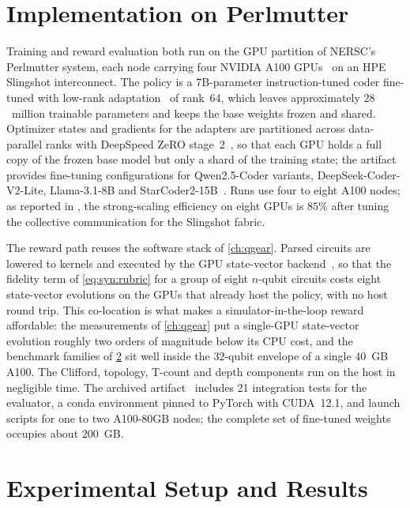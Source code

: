 \section{Implementation on Perlmutter}\label{sec:syn:impl}

Training and reward evaluation both run on the GPU partition of NERSC's Perlmutter system, each node carrying four NVIDIA A100 GPUs~\cite{choquette2021a100} on an HPE Slingshot interconnect. The policy is a 7B-parameter instruction-tuned coder fine-tuned with low-rank adaptation~\cite{hu2022lora} of rank~$64$, which leaves approximately $28$~million trainable parameters and keeps the base weights frozen and shared. Optimizer states and gradients for the adapters are partitioned across data-parallel ranks with DeepSpeed ZeRO stage~2~\cite{rajbhandari2020zero}, so that each GPU holds a full copy of the frozen base model but only a shard of the training state; the artifact provides fine-tuning configurations for Qwen2.5-Coder variants, DeepSeek-Coder-V2-Lite, Llama-3.1-8B and StarCoder2-15B~\cite{guo2026rubriqsoftware}. Runs use four to eight A100 nodes; as reported in \cite{guo2026rubriq}, the strong-scaling efficiency on eight GPUs is $85\%$ after tuning the collective communication for the Slingshot fabric.

The reward path reuses the software stack of \cref{ch:qgear}. Parsed circuits are lowered to \cudaq{} kernels and executed by the GPU state-vector backend~\cite{kim2023cudaquantum}, so that the fidelity term of \cref{eq:syn:rubric} for a group of eight $n$-qubit circuits costs eight state-vector evolutions on the GPUs that already host the policy, with no host round trip. This co-location is what makes a simulator-in-the-loop reward affordable: the \qgear{} measurements of \cref{ch:qgear} put a single-GPU state-vector evolution roughly two orders of magnitude below its CPU cost, and the benchmark families of \cref{sec:syn:results} sit well inside the $32$-qubit envelope of a single 40~GB A100. The Clifford, topology, T-count and depth components run on the host in negligible time. The archived artifact~\cite{guo2026rubriqsoftware} includes 21 integration tests for the evaluator, a conda environment pinned to PyTorch with CUDA~12.1, and launch scripts for one to two A100-80GB nodes; the complete set of fine-tuned weights occupies about 200~GB.

\section{Experimental Setup and Results}\label{sec:syn:results}

